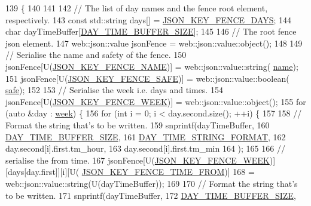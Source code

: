 \begin{DoxyCode}
139                                    \{
140 
141 
142     \textcolor{comment}{// The list of day names and the fence root element, respectively.}
143     \textcolor{keyword}{const} std::string days[] = \hyperlink{_fence_8h_a189c5645c45c0d8943719ee620afa4b2}{JSON\_KEY\_FENCE\_DAYS};
144     \textcolor{keywordtype}{char} dayTimeBuffer[\hyperlink{_fence_8cpp_a69b35d746bf626a8192e75810e701320}{DAY\_TIME\_BUFFER\_SIZE}];
145 
146     \textcolor{comment}{// The root fence json element.}
147     web::json::value jsonFence = web::json::value::object();
148 
149     \textcolor{comment}{// Serialise the name and safety of the fence.}
150     jsonFence[U(\hyperlink{_fence_8h_a0bf10e901f60610c8a47c143051deea4}{JSON\_KEY\_FENCE\_NAME})] = web::json::value::string(
      \hyperlink{class_fence_aa405676733f25812b38ea0dd9ccd1863}{name});
151     jsonFence[U(\hyperlink{_fence_8h_a4b2bc1fec134d7881cd286c8b6741752}{JSON\_KEY\_FENCE\_SAFE})] = web::json::value::boolean(
      \hyperlink{class_fence_ad570430040eee657c625a67d5589c4b5}{safe});
152 
153     \textcolor{comment}{// Serialise the week i.e. days and times.}
154     jsonFence[U(\hyperlink{_fence_8h_a94c5efe13ae824c55eebaa9e8a76dd57}{JSON\_KEY\_FENCE\_WEEK})] = web::json::value::object();
155     \textcolor{keywordflow}{for} (\textcolor{keyword}{auto} &day : \hyperlink{class_fence_ae589e973fa03316847aeceedd72e2b64}{week}) \{
156         \textcolor{keywordflow}{for} (\textcolor{keywordtype}{int} i = 0; i < day.second.size(); ++i) \{
157 
158             \textcolor{comment}{// Format the string that's to be written.}
159             snprintf(dayTimeBuffer,
160                      \hyperlink{_fence_8cpp_a69b35d746bf626a8192e75810e701320}{DAY\_TIME\_BUFFER\_SIZE},
161                      \hyperlink{_fence_8cpp_aa7662fb39f778fae608e70d079dc11ea}{DAY\_TIME\_STRING\_FORMAT},
162                      day.second[i].first.tm\_hour,
163                      day.second[i].first.tm\_min
164             );
165 
166             \textcolor{comment}{// serialise the from time.}
167             jsonFence[U(\hyperlink{_fence_8h_a94c5efe13ae824c55eebaa9e8a76dd57}{JSON\_KEY\_FENCE\_WEEK})][days[day.first]][i][U(
      \hyperlink{_fence_8h_a7993b3aacbec44628f2d9ab7df6ff5b9}{JSON\_KEY\_FENCE\_TIME\_FROM})]
168                     = web::json::value::string(U(dayTimeBuffer));
169 
170             \textcolor{comment}{// Format the string that's to be written.}
171             snprintf(dayTimeBuffer,
172                      \hyperlink{_fence_8cpp_a69b35d746bf626a8192e75810e701320}{DAY\_TIME\_BUFFER\_SIZE},

\end{DoxyCode}
